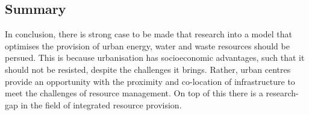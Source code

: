 \subsection{Summary}
In conclusion, there is strong case to be made that research into a model that optimises the provision of urban energy, water and waste resources should be persued. This is because urbanisation has socioeconomic advantages, such that it should not be resisted, despite the challenges it brings. Rather, urban centres provide an opportunity with the proximity and co-location of infrastructure to meet the challenges of resource management. On top of this there is a research-gap in the field of integrated resource provision.
